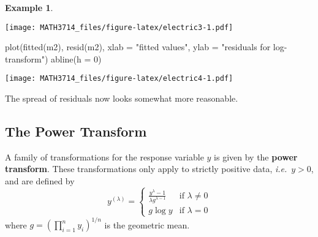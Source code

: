 \documentclass[
  a4paper,
]{article}
\newenvironment{Shaded}{\begin{snugshade}}{\end{snugshade}}
\newcommand{\AttributeTok}[1]{\textcolor[rgb]{0.77,0.63,0.00}{#1}}
\newcommand{\DecValTok}[1]{\textcolor[rgb]{0.00,0.00,0.81}{#1}}
\newcommand{\FunctionTok}[1]{\textcolor[rgb]{0.00,0.00,0.00}{#1}}
\newcommand{\NormalTok}[1]{#1}
\newcommand{\OtherTok}[1]{\textcolor[rgb]{0.56,0.35,0.01}{#1}}
\newcommand{\SpecialCharTok}[1]{\textcolor[rgb]{0.00,0.00,0.00}{#1}}
\newcommand{\StringTok}[1]{\textcolor[rgb]{0.31,0.60,0.02}{#1}}
\theoremstyle{definition}
\theoremstyle{definition}
\newtheorem{example}{Example}[section]
\theoremstyle{definition}
\theoremstyle{definition}
\theoremstyle{remark}
\begin{document}
\begin{example}
\begin{Shaded}
\end{Shaded}

\texttt{[image: MATH3714\_files/figure-latex/electric3-1.pdf]}

\begin{Shaded}
\begin{Highlighting}[]
\FunctionTok{plot}\NormalTok{(}\FunctionTok{fitted}\NormalTok{(m2), }\FunctionTok{resid}\NormalTok{(m2),}
     \AttributeTok{xlab =} \StringTok{"fitted values"}\NormalTok{, }\AttributeTok{ylab =} \StringTok{"residuals for log{-}transform"}\NormalTok{)}
\FunctionTok{abline}\NormalTok{(}\AttributeTok{h =} \DecValTok{0}\NormalTok{)}
\end{Highlighting}
\end{Shaded}

\texttt{[image: MATH3714\_files/figure-latex/electric4-1.pdf]}

The spread of residuals now looks somewhat more reasonable.
\end{example}

\hypertarget{power-transform}{%
\subsection{The Power Transform}\label{power-transform}}

A family of transformations for the response variable \(y\) is given by the
\textbf{power transform}. These transformations only apply to strictly positive data,
\emph{i.e.}~\(y > 0\), and are defined by
\begin{equation*}
  y^{(\lambda)}
  = \begin{cases}
      \frac{\displaystyle y^\lambda-1}{\displaystyle\lambda g^{\lambda-1}} & \mbox{if $\lambda\ne 0$} \\
      g\log y & \mbox{if $\lambda=0$}
    \end{cases}
\end{equation*}
where \(g = (\prod_{i=1}^n y_i)^{1/n}\) is the geometric mean.
\end{document}
